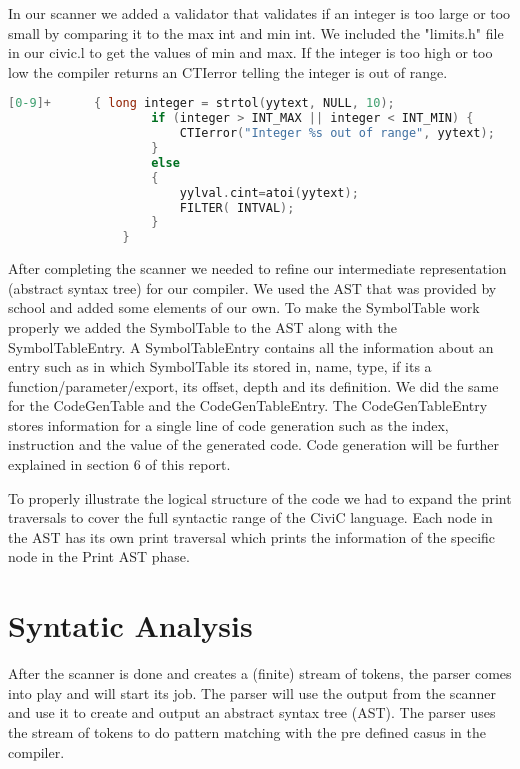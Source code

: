 \documentclass{uva-inf-article}
\begin{document}
In our scanner we added a validator that validates if an integer is too large or too small by 
comparing it to the max int and min int. We included the "limits.h" file in our civic.l
to get the values of min and max. If the integer is too high or too low the compiler
returns an CTIerror telling the integer is out of range.

\begin{lstlisting}[basicstyle=\small, language=C, label=lst:code, caption=Integer range check, captionpos=b]
    [0-9]+      { long integer = strtol(yytext, NULL, 10);
                    if (integer > INT_MAX || integer < INT_MIN) {
                        CTIerror("Integer %s out of range", yytext);
                    }
                    else
                    {
                        yylval.cint=atoi(yytext);
                        FILTER( INTVAL);
                    }
                }
\end{lstlisting}



After completing the scanner we needed to refine our intermediate representation (abstract
syntax tree) for our compiler. We used the AST that was provided by school and added some 
elements of our own. To make the SymbolTable work properly we added the SymbolTable to the
AST along with the SymbolTableEntry. A SymbolTableEntry contains all the information about 
an entry such as in which SymbolTable its stored in, name, type, if its a function/parameter/export,
its offset, depth and its definition. We did the same for the CodeGenTable and the CodeGenTableEntry.
The CodeGenTableEntry stores information for a single line of code generation such as the
index, instruction and the value of the generated code. Code generation will be further 
explained in section 6 of this report.

To properly illustrate the logical structure of the code we had to expand the print traversals
to cover the full syntactic range of the CiviC language. Each node in the AST has its own
print traversal which prints the information of the specific node in the Print AST phase.



\newpage
\section{Syntatic Analysis}
After the scanner is done and creates a (finite) stream of tokens, the parser comes
into play and will start its job. The parser will use the output from the scanner and
use it to create and output an abstract syntax tree (AST). The parser uses the stream 
of tokens to do pattern matching with the pre defined casus in the compiler. 
\end{document}
